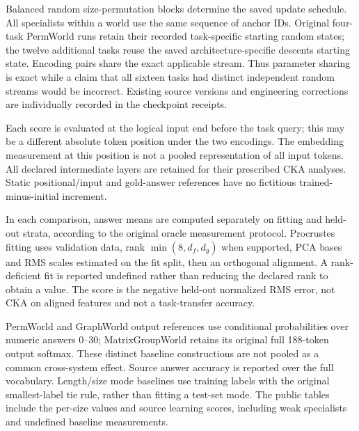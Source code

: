 \documentclass[10pt]{article}
\begin{document}
Balanced random size-permutation blocks determine the saved update
schedule. All specialists within a world use the same sequence of anchor
IDs. Original four-task PermWorld runs retain their recorded task-specific
starting random states; the twelve additional tasks reuse the saved
architecture-specific descents starting state. Encoding pairs share the
exact applicable stream. Thus parameter sharing is exact while a claim
that all sixteen tasks had distinct independent random streams would be
incorrect. Existing source versions and engineering corrections are
individually recorded in the checkpoint receipts.

Each score is evaluated at the logical input end before the task query;
this may be a different absolute token position under the two encodings.
The embedding measurement at this position is not a pooled representation
of all input tokens. All declared intermediate layers are retained for
their prescribed CKA analyses. Static positional/input and gold-answer
references have no fictitious trained-minus-initial increment.

In each comparison, answer means are computed separately on fitting and
held-out strata, according to the original oracle measurement protocol.
Procrustes fitting uses validation data, rank
$\min(8,d_f,d_g)$ when supported, PCA bases and RMS scales estimated on the
fit split, then an orthogonal alignment. A rank-deficient fit is reported
undefined rather than reducing the declared rank to obtain a value.
The score is the negative held-out normalized RMS error, not CKA on
aligned features and not a task-transfer accuracy.

PermWorld and GraphWorld output references use conditional probabilities
over numeric answers 0--30; MatrixGroupWorld retains its original full
188-token output softmax. These distinct baseline constructions are not
pooled as a common cross-system effect. Source answer accuracy is reported
over the full vocabulary. Length/size mode baselines use training labels
with the original smallest-label tie rule, rather than fitting a test-set
mode. The public tables include the per-size values and source learning
scores, including weak specialists and undefined baseline measurements.
\end{document}
